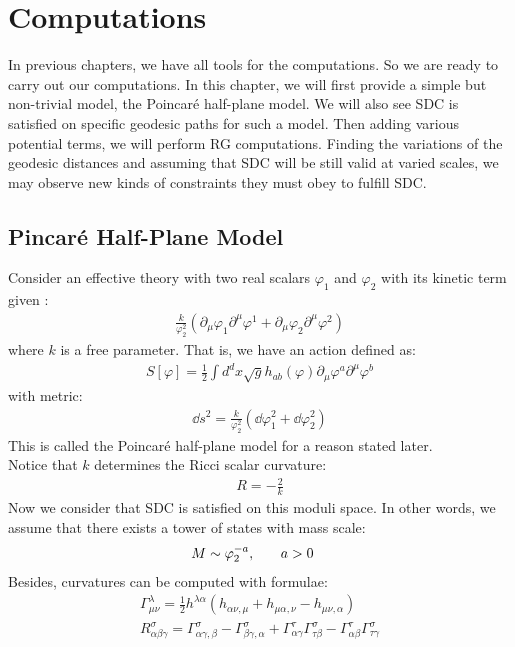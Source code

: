 \chapter{Computations}
\label{computations}
In previous chapters, we have all tools for the computations. So we are ready to carry out our computations. In this chapter, we will first provide a simple but non-trivial model, the Poincaré half-plane model. We will also see SDC is satisfied on specific geodesic paths for such a model. Then adding various potential terms, we will perform RG computations. Finding the variations of the geodesic distances and assuming that SDC will be still valid at varied scales, we may observe new kinds of constraints they must obey to fulfill SDC. 

\section{Pincaré Half-Plane Model}
    Consider an effective theory with two real scalars $\varphi_{1}$ and $\varphi_{2}$ with its kinetic term given \parencite{calderon-infante_convex_2021-1}:
\begin{align}
    \frac{k}{\varphi_{2}^{2}} (\partial _{\mu} \varphi_{1}\partial ^{\mu} \varphi ^{1} + \partial _{\mu} \varphi_{2} \partial ^{\mu} \varphi ^{2})
\end{align}
where $k$ is a free parameter. That is, we have an action defined as:
\begin{align}
    S[\varphi] = \frac{1}{2}\int d^{d}x \sqrt{g} h_{ab}(\varphi) \partial _{\mu} \varphi^{a} \partial ^{\mu} \varphi^{b}
\end{align}
with metric:
\begin{align}
    \dd s^{2} = \frac{k}{\varphi_{2}^{2}} (\dd \varphi_{1}^{2} + \dd \varphi_{2}^{2} )
\end{align}
This is called the Poincaré half-plane model for a reason stated later. \\
Notice that $k$ determines the Ricci scalar curvature:
\begin{align}
    R = -\frac{2}{k}
\end{align}
Now we consider that SDC is satisfied on this moduli space. In other words, we assume that there exists a tower of states with mass scale:
\begin{align}
    M \sim \varphi_{2}^{-a} ,& \qq{} a>0
\end{align}
Besides, curvatures can be computed with formulae:
\begin{align}
    \Gamma _{\mu \nu}^{\lambda} = \frac{1}{2} h^{\lambda \alpha} (h_{\alpha \nu , \mu} + h_{\mu \alpha, \nu} - h_{\mu \nu ,\alpha}) \\
    R_{\alpha \beta \gamma} ^{\sigma} = \Gamma _{\alpha \gamma, \beta} ^{\sigma} - \Gamma _{\beta \gamma , \alpha} ^{\sigma} + \Gamma _{\alpha \gamma} ^{\tau} \Gamma _{\tau \beta} ^{\sigma} - \Gamma_{\alpha \beta}^{\tau} \Gamma_{\tau \gamma} ^{\sigma}
\end{align}

